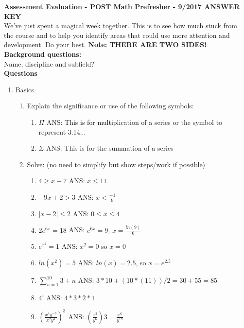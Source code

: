 \documentclass[11pt]{article}
\begin{document}
\noindent\textbf{Assessment Evaluation  - POST Math Prefresher - 9/2017  ANSWER KEY} \\
We've just spent a magical week together. This is to see how much stuck from the course and to help you identify areas that could use more attention and development. Do your best.  \textbf{Note: THERE ARE TWO SIDES!} \\

\noindent \textbf{Background questions:} \\
\indent Name, discipline and subfield? \\

\vspace{3mm}
\noindent \textbf{Questions}

\begin{enumerate}

\item Basics
\begin{enumerate}
\item Explain the significance or use of the following symbols:
\begin{enumerate} 
\item $\Pi$ \color{gray} ANS: This is for multiplication of a series or the symbol to represent 3.14... \color{black}
\item $\Sigma$  \color{gray} ANS: This is for the summation of a series  \color{black}
\end{enumerate}


\item Solve: (no need to simplify but show steps/work if possible)
\begin{enumerate}
\item $4\geq x-7$  \color{gray} ANS: $x \leq 11$ \color{black} \\
\item $-9x+2>3$ \color{gray} ANS: $x < \frac{-1}{9}$ \color{black} \\
\item $|x-2|\leq2$  \color{gray} ANS: $0 \leq x \leq 4$ \color{black} \\
\item $2e^{6x}=18$  \color{gray} ANS: $e^{6x}=9$, $x=\frac{ln(9)}{6}$ \color{black} \\
\item $e^{x^2}=1$ \color{gray} ANS: $x^2=0$ so $x=0$ \color{black} \\
\item $ln(x^2)=5$ \color{gray} ANS: $ln(x)=2.5$, so $x=e^2.5$\color{black} \\
\item $\sum_{n=1}^{10} 3+n $ \color{gray} ANS: $3*10+(10*(11))/2=30+55=85$ \color{black} \\
\item $4!$\color{gray} ANS: $4*3*2*1$ \color{black} \\
\item $(\frac{x^4y^{-3}}{x^2y^3})^3$ \color{gray} ANS: $(\frac{x^2}{y^6})3=\frac{x^6}{y^18}$\color{black} \\
\end{enumerate}


\end{enumerate}
\end{enumerate}
\end{document}

